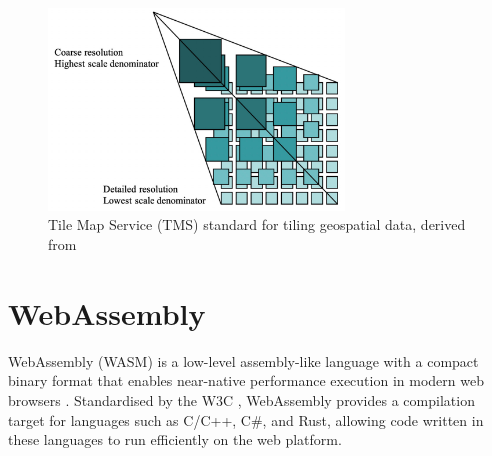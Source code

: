 \begin{figure}[ht]
  \centering
  \includegraphics[width=0.7\textwidth]{figs/related_work_theoretical_bg/tms.png}
  \caption{Tile Map Service (TMS) standard for tiling geospatial data, derived from \citet{tms}}
  \label{fig:tms}
\end{figure}




\section{WebAssembly}
\label{tb:webassembly}
WebAssembly (WASM) is a low-level assembly-like language with a compact binary format that enables near-native performance execution in modern web browsers \citep{WebAssembly}. Standardised by the W3C \citep{WebAssemblyCoreSpecification1, WebAssemblyCoreSpecification2}, WebAssembly provides a compilation target for languages such as C/C++, C\#, and Rust, allowing code written in these languages to run efficiently on the web platform.

